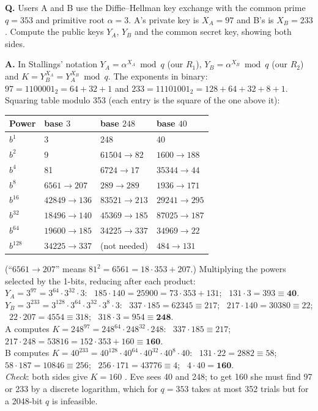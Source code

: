 \begin{worked}
\textbf{Q.} Users A and B use the Diffie--Hellman key exchange with the common prime $q = 353$ and primitive root $\alpha = 3$. A's private key is $X_A = 97$ and B's is $X_B = 233$. Compute the public keys $Y_A$, $Y_B$ and the common secret key, showing both sides.

\textbf{A.} In Stallings' notation $Y_A = \alpha^{X_A} \bmod q$ (our $R_1$), $Y_B = \alpha^{X_B} \bmod q$ (our $R_2$) and $K = Y_B^{X_A} = Y_A^{X_B} \bmod q$. The exponents in binary: $97 = 1100001_2 = 64 + 32 + 1$ and $233 = 11101001_2 = 128 + 64 + 32 + 8 + 1$. Squaring table modulo 353 (each entry is the square of the one above it):
\begin{center}\small
\begin{tabular}{@{}llll@{}}
\toprule
Power & base $3$ & base $248$ & base $40$\\
\midrule
$b^{1}$ & 3 & 248 & 40\\
$b^{2}$ & 9 & $61504 \to 82$ & $1600 \to 188$\\
$b^{4}$ & 81 & $6724 \to 17$ & $35344 \to 44$\\
$b^{8}$ & $6561 \to 207$ & $289 \to 289$ & $1936 \to 171$\\
$b^{16}$ & $42849 \to 136$ & $83521 \to 213$ & $29241 \to 295$\\
$b^{32}$ & $18496 \to 140$ & $45369 \to 185$ & $87025 \to 187$\\
$b^{64}$ & $19600 \to 185$ & $34225 \to 337$ & $34969 \to 22$\\
$b^{128}$ & $34225 \to 337$ & (not needed) & $484 \to 131$\\
\bottomrule
\end{tabular}
\end{center}
(``$6561 \to 207$'' means $81^2 = 6561 = 18 \cdot 353 + 207$.) Multiplying the powers selected by the 1-bits, reducing after each product:\\
$Y_A = 3^{97} = 3^{64} \cdot 3^{32} \cdot 3$: \ $185 \cdot 140 = 25900 = 73 \cdot 353 + 131$; \ $131 \cdot 3 = 393 \equiv \mathbf{40}$.\\
$Y_B = 3^{233} = 3^{128} \cdot 3^{64} \cdot 3^{32} \cdot 3^{8} \cdot 3$: \ $337 \cdot 185 = 62345 \equiv 217$; \ $217 \cdot 140 = 30380 \equiv 22$; \ $22 \cdot 207 = 4554 \equiv 318$; \ $318 \cdot 3 = 954 \equiv \mathbf{248}$.\\
A computes $K = 248^{97} = 248^{64} \cdot 248^{32} \cdot 248$: \ $337 \cdot 185 \equiv 217$; \ $217 \cdot 248 = 53816 = 152 \cdot 353 + 160 \equiv \mathbf{160}$.\\
B computes $K = 40^{233} = 40^{128} \cdot 40^{64} \cdot 40^{32} \cdot 40^{8} \cdot 40$: \ $131 \cdot 22 = 2882 \equiv 58$; \ $58 \cdot 187 = 10846 \equiv 256$; \ $256 \cdot 171 = 43776 \equiv 4$; \ $4 \cdot 40 = \mathbf{160}$.\\
\emph{Check}: both sides give $K = 160$ \checkmark. Eve sees 40 and 248; to get 160 she must find 97 or 233 by a discrete logarithm, which for $q = 353$ takes at most 352 trials but for a 2048-bit $q$ is infeasible.
\end{worked}

